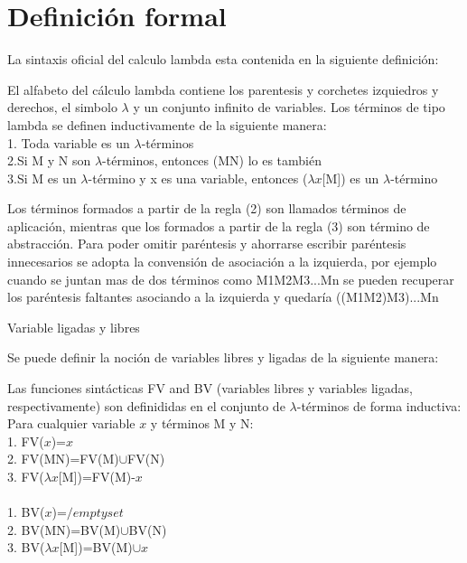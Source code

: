  \section{Definición formal}

 La sintaxis oficial del calculo lambda esta contenida en la siguiente definición:

 \begin{definition}[]
   El alfabeto del cálculo lambda contiene los parentesis y corchetes izquiedros y derechos, el simbolo $\lambda$ y un conjunto infinito de variables. Los términos de tipo lambda se definen inductivamente de la siguiente manera:\\
   1. Toda variable es un $\lambda$-términos\\
   2.Si M y N son $\lambda$-términos, entonces (MN) lo es también\\
   3.Si M es un $\lambda$-término y x es una variable, entonces ($\lambda$$x$[M]) es un $\lambda$-término\\
\end{definition}

Los términos formados a partir de la regla (2) son llamados términos de aplicación, mientras que los formados a partir de la regla (3) son término de abstracción.
Para poder omitir paréntesis y ahorrarse escribir paréntesis innecesarios se adopta la convensión de asociación a la izquierda, por ejemplo cuando se juntan mas de dos términos como M1M2M3...Mn se pueden recuperar los paréntesis faltantes asociando a la izquierda y quedaría ((M1M2)M3)...Mn

Variable ligadas y libres

Se puede definir la noción de variables libres y ligadas de la siguiente manera:

\begin{definition}[]
  Las funciones sintácticas FV and BV (variables libres y variables ligadas, respectivamente) son definididas en el conjunto de $\lambda$-términos de forma inductiva:\\
  Para cualquier variable $x$ y términos M y N:\\
  1. FV($x$)={$x$}\\
  2. FV(MN)=FV(M)$\cup$FV(N)\\
  3. FV($\lambda$$x$[M])=FV(M)-{$x$}\\
  \\
  1. BV($x$)={$/emptyset$}\\
  2. BV(MN)=BV(M)$\cup$BV(N)\\
  3. BV($\lambda$$x$[M])=BV(M)$\cup${$x$}\\
\end{definition}

